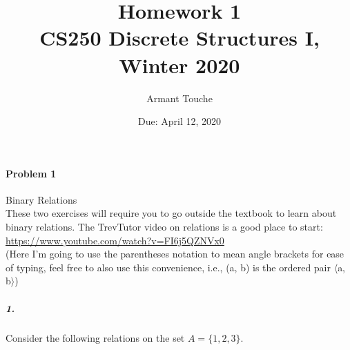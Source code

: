 \documentclass[11pt, a4paper]{article}
\title{\bf Homework 1\\[1ex]
\rm\normalsize CS250 Discrete Structures I, Winter 2020 }
\date{\normalsize Due: April 12, 2020}
\author{\normalsize Armant Touche}
\newcommand{\stuple}[1]{$\langle$#1$\rangle$} %
\begin{document}
 
\vspace{0cm}\maketitle 
	\paragraph{Problem 1} Binary Relations\\

	These two exercises will require you to go outside the textbook to learn about binary relations. The TrevTutor video on relations is a good place to start: \url{https://www.youtube.com/watch?v=FI6j5QZNVx0}\\
	(Here I'm going to use the parentheses notation to mean angle brackets for ease of typing, feel free to also use this convenience, i.e., (a, b) is the ordered pair \stuple{a, b})
		\subparagraph{1.} Consider the following relations on the set $A = \{1, 2, 3\}$.
\end{document}
